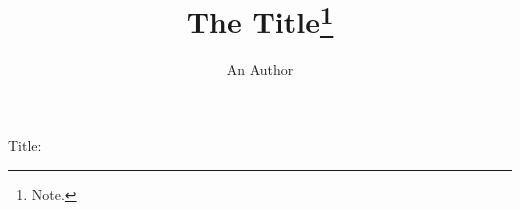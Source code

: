 \documentclass{article}
\title{The Title\thanks{Note.}}
\author{An Author}
\begin{document}
Title: \thetitle
\end{document}
